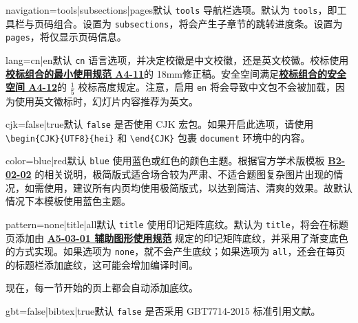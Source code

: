 \documentclass[a4paper,12pt]{article}
\begin{document}
\begin{CJK}{UTF8}{song}
\begin{docKey*}[SJTUBeamermin]{navigation}{=tools|subsections|pages}{默认 \texttt{tools}}
    导航栏选项。默认为 \verb"tools"，即工具栏与页码组合。设置为 \verb"subsections"，将会产生子章节的跳转进度条。设置为 \verb"pages"，将仅显示页码信息。
\end{docKey*}

\begin{docKey*}[SJTUBeamermin]{lang}{=cn|en}{默认 \texttt{cn}}
    语言选项，并决定校徽是中文校徽，还是英文校徽。校标使用\href{http://vi.sjtu.edu.cn/index.php/articles/base/4}{\textbf{校标组合的最小使用规范 A4-11}}的 18mm修正稿。安全空间满足\href{http://vi.sjtu.edu.cn/index.php/articles/base/4}{\textbf{校标组合的安全空间 A4-12}}的 $\frac{1}{5}$ 校标高度规定。注意，启用 \texttt{en} 将会导致中文包不会被加载，因为使用英文徽标时，幻灯片内容推荐为英文。
\end{docKey*}

\begin{docKey*}[SJTUBeamermin]{cjk}{=false|true}{默认 \texttt{false}}
    是否使用 \textsf{CJK} 宏包。如果开启此选项，请使用 \verb"\begin{CJK}{UTF8}{hei}" 和 \verb"\end{CJK}" 包裹 \verb"document" 环境中的内容。
\end{docKey*}

\begin{docKey*}[SJTUBeamermin]{color}{=blue|red}{默认 \texttt{blue}}
    使用蓝色或红色的颜色主题。根据官方学术版模板 \href{http://vi.sjtu.edu.cn/index.php/articles/app/8}{\textbf{B2-02-02}} 的相关说明，极简版式适合场合较为严肃、不适合题图复杂图片出现的情况，如需使用，建议所有内页均使用极简版式，以达到简洁、清爽的效果。故默认情况下本模板使用蓝色主题。
\end{docKey*}

\begin{docKey*}[SJTUBeamermin]{pattern}{=none|title|all}{默认 \texttt{title}}
    使用印记矩阵底纹。默认为 \verb"title"，将会在标题页添加由 \href{http://vi.sjtu.edu.cn/index.php/articles/base/5}{\textbf{A5-03-01 辅助图形使用规范}} 规定的印记矩阵底纹，并采用了渐变底色的方式实现。如果选项为 \verb"none"，就不会产生底纹；如果选项为 \verb"all"，还会在每页的标题栏添加底纹，这可能会增加编译时间。

    现在，每一节开始的页上都会自动添加底纹。
\end{docKey*}

\begin{docKey*}[SJTUBeamermin]{gbt}{=false|bibtex|true}{默认 \texttt{false}}
    是否采用 GBT7714-2015 标准引用文献。
    

\end{docKey*}
\end{CJK}
\end{document}
